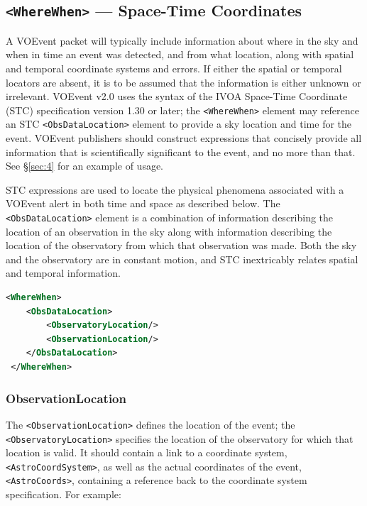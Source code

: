 \documentclass[11pt,a4paper]{ivoa}
\begin{document}
\subsection{{\tt <WhereWhen>} --- Space-Time Coordinates}
\label{sec:3.4}

A VOEvent packet will typically include information about where in the sky and when in time an event was detected, and from what location, along with spatial and temporal coordinate systems and errors. If either the spatial or temporal locators are absent, it is to be assumed that the information is either unknown or irrelevant. VOEvent v2.0 uses the syntax of the IVOA Space-Time Coordinate (STC) specification version 1.30 or later; the {\tt <WhereWhen>} element may reference an STC \citep{2007ivoa.spec.1030R} {\tt <ObsDataLocation>} element to provide a sky location and time for the event. VOEvent publishers should construct expressions that concisely provide all information that is scientifically significant to the event, and no more than that. See \S\ref{sec:4} for an example of usage. 

STC expressions are used to locate the physical phenomena associated with a VOEvent alert in both time and space as described below. The {\tt <ObsDataLocation>} element is a combination of information describing the location of an observation in the sky along with information describing the location of the observatory from which that observation was made. Both the sky and the observatory are in constant motion, and STC inextricably relates spatial and temporal information. 

\begin{lstlisting}[language=XML]
<WhereWhen>
    <ObsDataLocation>
        <ObservatoryLocation/>
        <ObservationLocation/>
    </ObsDataLocation>
 </WhereWhen>
\end{lstlisting}

\subsubsection{ObservationLocation}
\label{sec:3.4.1}

The {\tt <ObservationLocation>} defines the location of the event; the {\tt <ObservatoryLocation>} specifies the location of the observatory for which that location is valid. It should contain a link to a coordinate system, {\tt <AstroCoordSystem>}, as well as the actual coordinates of the event, {\tt <AstroCoords>}, containing a reference back to the coordinate system specification. For example: 
\end{document}
